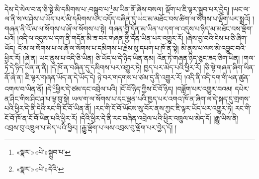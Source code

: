 དེས་དེ་སེལ་བ་ན་ཅི་སྟེ་མི་དམིགས་པ་:བསྒྲུབ་པ་\footnote{«སྣར་»«པེ་»སྒྲུབ་པ་}མ་ཡིན་ནོ་ཞེས་བསལ། ལྡོག་པ་ཇི་ལྟར་སྒྲུབ་པར་བྱེད། །ཡང་ལ་ལ་ནི་ས་ལ་ཤེས་པ་ཡོད་པར་མི་དམིགས་པར་འདོད་བཞིན་དུ་ཡང་མ་མཐོང་བས་ཚིག་ལ་སོགས་པ་ལྡོག་པར་སྨྲའོ། །གཞན་ནི་འོ་མ་ལ་སོགས་པ་ཞོ་ལ་སོགས་པ་སྟེ། གཞན་གྱི་དོན་མ་ཡིན་པ་དག་ལ་འདུས་པ་ཉིད་མ་མཐོང་བས་ལྡོག་པའོ། །འདི་ལ་འདུས་པ་དག་ནི་གདོན་མི་ཟ་བར་གཞན་གྱི་དོན་ཡིན་པར་འགྱུར་རོ། །ཞེས་བྱ་བའི་ངེས་པ་ཅི་ཞིག་ཡོད། འོ་མ་ལ་སོགས་པ་ལ་ཞོ་ལ་སོགས་པ་དམིགས་པ་རྗེས་སུ་དཔག་པ་ཁོ་ན་སྟེ། མི་ནུས་པ་ལས་མི་འབྱུང་བའི་ཕྱིར་རོ། །ཞེ་ན། ཡང་ནུས་པ་འདི་ཅི་ཡིན། ཅི་ཡོད་པ་དེ་ཉིད་ཡིན་ནམ། འོན་ཏེ་གཞན་ཉིད་ཅུང་ཟད་ཅིག་ཡིན། །གལ་ཏེ་དེ་ཉིད་ཡིན་ན་ནི། །དེ་ཁོ་ན་བཞིན་དུ་དམིགས་པར་འགྱུར་ཏེ། ཁྱད་པར་མེད་པའི་ཕྱིར་རོ། །ཅི་སྟེ་གཞན་ཞིག་ཡིན་ནོ་ཞེ་ན། ཇི་ལྟར་གཞན་ཡོད་ན་དེ་ཡོད་དེ། ཉེ་བར་གདགས་པ་ཙམ་དུ་ནི་འགྱུར་རོ། །འདི་ནི་འདི་དག་གི་ཕན་ཚུན་འགལ་བ་ཡིན་ནོ། །དེ་\footnote{«སྣར་»«པེ་»དེའི་}ཕྱིར་དེ་ཙམ་དང་འབྲེལ་པའི། །ངོ་བོ་ཉིད་ཀྱིས་ངོ་བོ་ཉིད། །བཟློག་པར་འགྱུར་བའམ། དཔེར་ན་ཤིང་གིས་ཤིང་ཤ་པ་ལྟ་བུ་སྟེ། ཡལ་ག་ལ་སོགས་པ་དང་ལྡན་པའི་ཁྱད་པར་འགའ་ཁོ་ན་ཞིག་ལ་དེ་སྐད་དུ་གྲགས་པའི་ཕྱིར་དེ་ནི་དེའི་རང་གི་ངོ་བོ་ཡིན་ནོ། །རང་གི་ངོ་བོ་ཡོངས་སུ་བོར་ནས་ཀྱང་ཇི་ལྟར་ཡོད་པར་འགྱུར་ཏེ། རང་གི་ངོ་བོ་ཁོ་ན་ངོ་བོ་ཡིན་པའི་ཕྱིར་རོ། །དེའི་ཕྱིར་དེ་ནི་རང་བཞིན་འབྲེལ་པའི་ཕྱིར་འཁྲུལ་པ་མེད་དོ། །རྒྱུ་ཡིས་ནི། འབྲས་བུ་འཁྲུལ་པ་མེད་པའི་ཕྱིར། །རྒྱུ་ལྡོག་པ་ལས་འབྲས་བུ་ལྡོག་པར་བྱེད་དོ། །
